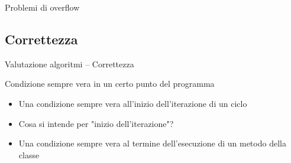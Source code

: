 \begin{frame}[shrink=10]{Problemi di overflow}

\vspace{-9pt}

\end{frame}


\subsection{Correttezza}

\begin{frame}{Valutazione algoritmi -- Correttezza}

\vspace{-9pt}
\begin{myboxtitle}[Invariante]
Condizione sempre vera in un certo punto del programma
\end{myboxtitle}

\begin{myboxtitle}
\begin{itemize}
\item Una condizione sempre vera all'inizio dell'iterazione di un ciclo
\item Cosa si intende per "inizio dell'iterazione"?
\end{itemize}
\end{myboxtitle}

\begin{myboxtitle}
\begin{itemize}
\item Una condizione sempre vera al termine dell'esecuzione di un metodo della classe
\end{itemize}
\end{myboxtitle}

\end{frame}

